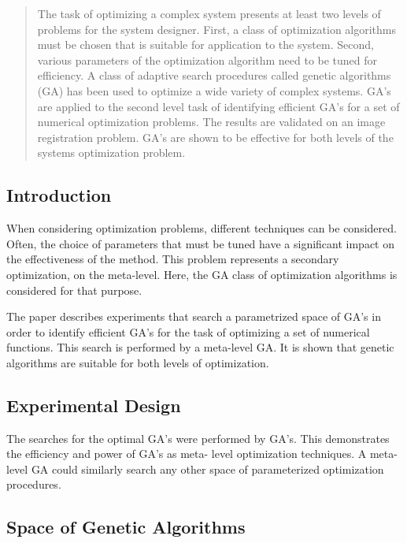 \documentclass[../main.tex]{subfiles}
\begin{document}
\begin{mdframed}
\end{mdframed}

\begin{abstract}
The task of optimizing a complex system presents at least two levels of problems for the system designer. First, a
class of optimization algorithms must be chosen that is suitable for application to the system. Second, various
parameters of the optimization algorithm need to be tuned for efficiency. A class of adaptive search procedures called
genetic algorithms (GA) has been used to optimize a wide variety of complex systems. GA's are applied to the second
level task of identifying efficient GA's for a set of numerical optimization problems. The results are validated on an
image registration problem. GA's are shown to be effective for both levels of the systems optimization problem.
\end{abstract}

\subsection{Introduction}

When considering optimization problems, different techniques can be considered. Often, the choice of parameters that
must be tuned have a significant impact on the effectiveness of the method. This problem represents a secondary
optimization, on the meta-level. Here, the GA class of optimization algorithms is considered for that purpose.

The paper describes experiments that search a parametrized space of GA's in order to identify efficient GA's for the
task of optimizing a set of numerical functions. This search is performed by a meta-level GA. It is shown that genetic
algorithms are suitable for both levels of optimization.

\subsection{Experimental Design}
The searches for the optimal GA's were performed by GA's. This demonstrates the efficiency and power of GA's as meta-
level optimization techniques. A meta-level GA could similarly search any other space of parameterized optimization
procedures.

\subsection{Space of Genetic Algorithms}
\end{document}
